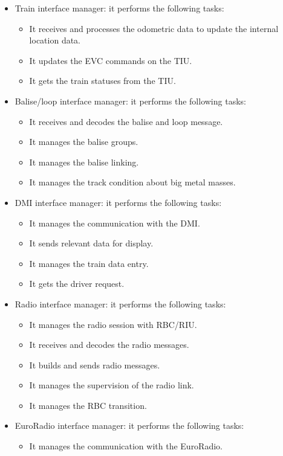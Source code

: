 \documentclass[nocc]{template/openetcs_report}
\begin{document}
\begin{itemize}
\item	Train interface manager: it performs the following tasks:
	\begin{itemize}
	\item	It receives and processes the odometric data to update the internal location data.
	\item	It updates the EVC commands on the TIU.
	\item	It gets the train statuses from the TIU.
	\end{itemize}
\item	Balise/loop interface manager: it performs the following tasks:
	\begin{itemize}
	\item	It receives and decodes the balise and loop message.
	\item	It manages the balise groups.
	\item	It manages the balise linking.
	\item	It manages the track condition about big metal masses.
	\end{itemize}
\item	DMI interface manager: it performs the following tasks:
	\begin{itemize}
	\item	It manages the communication with the DMI.
	\item	It sends relevant data for display.
	\item	It manages the train data entry.
	\item	It gets the driver request.
	\end{itemize}
\item	Radio interface manager: it performs the following tasks:
	\begin{itemize}
	\item	It manages the radio session with RBC/RIU.
	\item	It receives and decodes the radio messages.
	\item	It builds and sends radio messages.
	\item	It manages the supervision of the radio link.
	\item	It manages the RBC transition.
	\end{itemize}
\item	EuroRadio interface manager: it performs the following tasks:
	\begin{itemize}
	\item It manages the communication with the EuroRadio.

\end{itemize}
\end{itemize}
\end{document}
